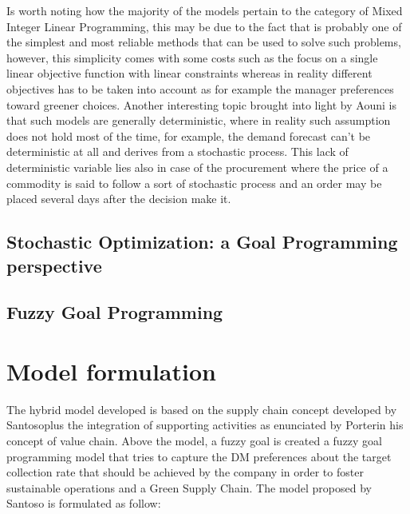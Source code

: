 \documentclass{article}
\begin{document}
  Is worth noting how the majority of the models pertain to the category of Mixed Integer Linear Programming, this may be due to the fact that is probably one of the simplest and most reliable methods that can be used to solve such problems, however, this simplicity comes with some costs such as the focus on a single linear objective function with linear constraints whereas in reality different objectives has to be taken into account as for example the manager preferences toward greener choices. Another interesting topic brought into light by Aouni \cite{azimian_supply_2017} is that such models are generally deterministic, where in reality such assumption does not hold most of the time, for example, the demand forecast can't be deterministic at all and derives from a stochastic process. This lack of deterministic variable lies also in case of the procurement where the price of a commodity is said to follow a sort of stochastic process and an order may be placed several days after the decision make it.
  
  \subsection{Stochastic Optimization: a Goal Programming perspective}
  
  \subsection{Fuzzy Goal Programming}

  \pagebreak

\section{Model formulation}
The hybrid model developed is based on the supply chain concept developed by Santoso\cite{Santoso_Ahmed_Goetschalckx_Shapiro_2005}plus the integration of supporting activities as enunciated by Porter\cite{CompetitiveAdvantage}in his concept of value chain. Above the model, a fuzzy goal is created a fuzzy goal programming model that tries to capture the  DM preferences about the target collection rate that should be achieved by the company in order to foster sustainable operations and a Green Supply Chain.
The model proposed by Santoso is formulated as follow:
\end{document}
